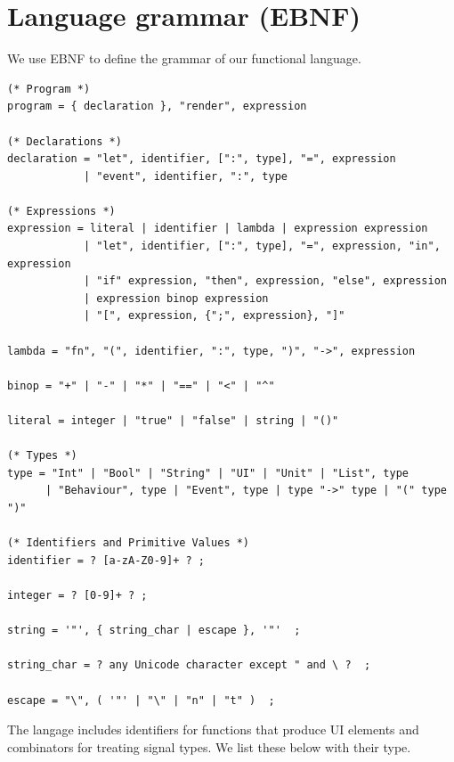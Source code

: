 
\section{Language grammar (EBNF)}

We use EBNF\cite{ISO14977} to define the grammar of our functional language.
\begin{lstlisting}
(* Program *)
program = { declaration }, "render", expression

(* Declarations *)
declaration = "let", identifier, [":", type], "=", expression
            | "event", identifier, ":", type

(* Expressions *)
expression = literal | identifier | lambda | expression expression
            | "let", identifier, [":", type], "=", expression, "in", expression
            | "if" expression, "then", expression, "else", expression
            | expression binop expression
            | "[", expression, {";", expression}, "]"

lambda = "fn", "(", identifier, ":", type, ")", "->", expression

binop = "+" | "-" | "*" | "==" | "<" | "^"

literal = integer | "true" | "false" | string | "()"

(* Types *)
type = "Int" | "Bool" | "String" | "UI" | "Unit" | "List", type
      | "Behaviour", type | "Event", type | type "->" type | "(" type ")"

(* Identifiers and Primitive Values *)
identifier = ? [a-zA-Z0-9]+ ? ;

integer = ? [0-9]+ ? ;

string = '"', { string_char | escape }, '"'  ;

string_char = ? any Unicode character except " and \ ?  ;

escape = "\", ( '"' | "\" | "n" | "t" )  ;
\end{lstlisting}

\medskip
\noindent The langage includes identifiers for functions that produce UI elements and combinators for treating signal types. We list these below with their type.


